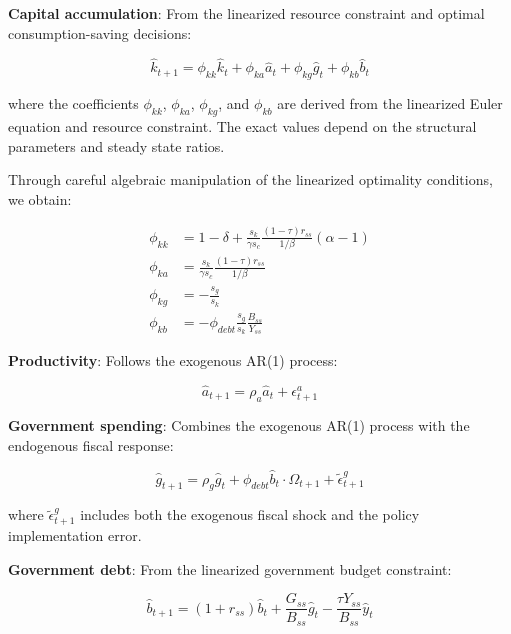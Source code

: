 \documentclass[5p,authoryear]{elsarticle}
\begin{document}
\textbf{Capital accumulation}: From the linearized resource constraint and optimal consumption-saving decisions:

\begin{equation}
\hat{k}_{t+1} = \phi_{kk} \hat{k}_t + \phi_{ka} \hat{a}_t + \phi_{kg} \hat{g}_t + \phi_{kb} \hat{b}_t
\label{eq:capital_law}
\end{equation}

where the coefficients $\phi_{kk}$, $\phi_{ka}$, $\phi_{kg}$, and $\phi_{kb}$ are derived from the linearized Euler equation and resource constraint. The exact values depend on the structural parameters and steady state ratios.

Through careful algebraic manipulation of the linearized optimality conditions, we obtain:

\begin{align}
\phi_{kk} &= 1 - \delta + \frac{s_k}{\gamma s_c} \frac{(1-\tau) r_{ss}}{1/\beta} (\alpha-1) \label{eq:phi_kk}\\
\phi_{ka} &= \frac{s_k}{\gamma s_c} \frac{(1-\tau) r_{ss}}{1/\beta} \label{eq:phi_ka}\\
\phi_{kg} &= -\frac{s_g}{s_k} \label{eq:phi_kg}\\
\phi_{kb} &= -\phi_{debt} \frac{s_g}{s_k} \frac{B_{ss}}{Y_{ss}} \label{eq:phi_kb}
\end{align}

\textbf{Productivity}: Follows the exogenous AR(1) process:

\begin{equation}
\hat{a}_{t+1} = \rho_a \hat{a}_t + \epsilon_{t+1}^a
\label{eq:productivity_law}
\end{equation}

\textbf{Government spending}: Combines the exogenous AR(1) process with the endogenous fiscal response:

\begin{equation}
\hat{g}_{t+1} = \rho_g \hat{g}_t + \phi_{debt} \hat{b}_t \cdot \Omega_{t+1} + \tilde{\epsilon}_{t+1}^g
\label{eq:government_law}
\end{equation}

where $\tilde{\epsilon}_{t+1}^g$ includes both the exogenous fiscal shock and the policy implementation error.

\textbf{Government debt}: From the linearized government budget constraint:

\begin{equation}
\hat{b}_{t+1} = (1 + r_{ss}) \hat{b}_t + \frac{G_{ss}}{B_{ss}} \hat{g}_t - \frac{\tau Y_{ss}}{B_{ss}} \hat{y}_t
\label{eq:debt_law}
\end{equation}
\end{document}
